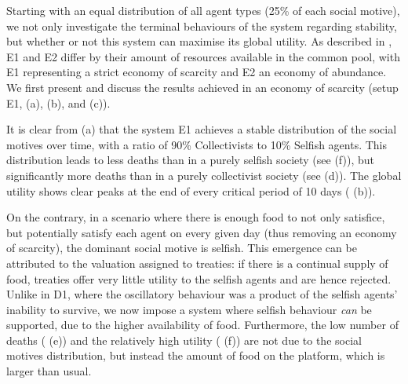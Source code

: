 

Starting with an equal distribution of all agent types (25\% of each social motive), we not only investigate the terminal behaviours of the system regarding stability, but whether or not this system can maximise its global utility. As described in , E1 and E2 differ by their amount of resources available in the common pool, with E1 representing a strict economy of scarcity and E2 an economy of abundance. We first present and discuss the results achieved in an economy of scarcity (setup E1,  (a), (b), and (c)).

It is clear from  (a) that the system E1 achieves a stable distribution of the social motives over time, with a ratio of 90\% Collectivists to 10\% Selfish agents. This distribution leads to less deaths than in a purely selfish society (see  (f)), but significantly more deaths than in a purely collectivist society (see  (d)). The global utility shows clear peaks at the end of every critical period of 10 days ( (b)).

On the contrary, in a scenario where there is enough food to not only satisfice, but potentially satisfy each agent on every given day (thus removing an economy of scarcity), the dominant social motive is selfish. This emergence can be attributed to the valuation assigned to treaties: if there is a continual supply of food, treaties offer very little utility to the selfish agents and are hence rejected. Unlike in D1, where the oscillatory behaviour was a product of the selfish agents' inability to survive, we now impose a system where selfish behaviour \textit{can} be supported, due to the higher availability of food. Furthermore, the low number of deaths ( (e)) and the relatively high utility ( (f)) are not due to the social motives distribution, but instead the amount of food on the platform, which is larger than usual.

